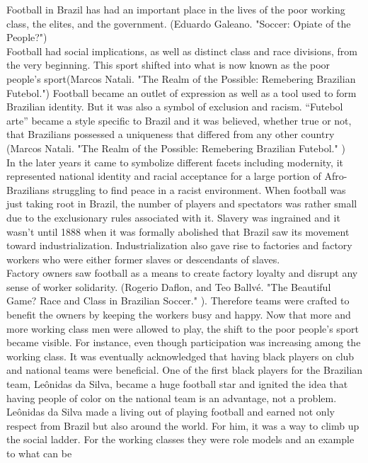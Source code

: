 \documentclass[a4paper,10pt]{report}
\title{}
\author{}
\begin{document}
Football in Brazil has had an important place in the lives of the poor working
class, the elites, and the government. (Eduardo Galeano. "Soccer: Opiate of the People?")
\\ Football had
social implications, as well as distinct class and race divisions, from the very beginning.
This sport shifted into what is now known as the poor people’s sport(Marcos Natali. "The Realm of the Possible: Remebering Brazilian Futebol.")
Football became an outlet of expression as well as a tool used to
form Brazilian identity. But it was also a symbol of exclusion and racism. “Futebol arte”
became a style specific to Brazil and it was believed, whether true or not, that Brazilians
possessed a uniqueness that differed from any other country (Marcos Natali. "The Realm of the Possible: Remebering Brazilian Futebol." )
\\In the later years it came to
symbolize different facets including modernity, it represented national identity and racial
acceptance for a large portion of Afro-Brazilians struggling to find peace in a racist
environment.
When football was just taking root in Brazil, the number of players and spectators was
rather small due to the exclusionary rules associated with it. Slavery was ingrained and it
wasn’t until 1888 when it was formally abolished that Brazil saw its movement toward
industrialization. Industrialization also gave rise to
factories and factory workers who were either former slaves or descendants of slaves.
\\Factory owners saw football as a means to create factory loyalty and disrupt any sense of
worker solidarity. (Rogerio Daflon, and Teo Ballvé. "The Beautiful Game? Race and Class in Brazilian Soccer." ).
Therefore teams were crafted to
benefit the owners by keeping the workers busy and happy. 
Now that more and more working
class men were allowed to play, the shift to the poor people’s sport became visible.
For instance, even though participation was increasing among the working class.
It was eventually acknowledged that having
black players on club and national teams were beneficial. One of the
first black players for the Brazilian team, Leônidas da Silva, became a huge football star
and ignited the idea that having people of color on the national team is an advantage, not
a problem. 
 Leônidas da Silva made a living out of playing football and earned not only respect
from Brazil but also around the world. For him, it was a way to climb up the social
ladder. For the working classes they were role models and an example to what can be
\end{document}
